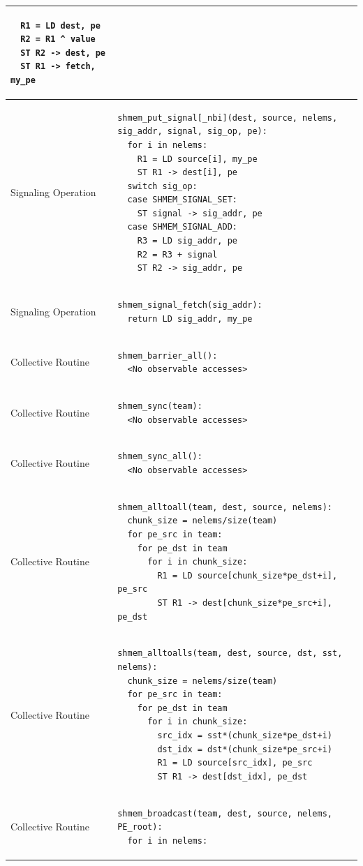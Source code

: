 \begin{longtable}{|m{}|m{}|}
\begin{BVerbatim}
  R1 = LD dest, pe
  R2 = R1 ^ value
  ST R2 -> dest, pe
  ST R1 -> fetch, my_pe
    \end{BVerbatim}
    \tabularnewline\hline
Signaling Operation
    & \begin{BVerbatim}
shmem_put_signal[_nbi](dest, source, nelems,
sig_addr, signal, sig_op, pe):
  for i in nelems:
    R1 = LD source[i], my_pe
    ST R1 -> dest[i], pe
  switch sig_op:
  case SHMEM_SIGNAL_SET:
    ST signal -> sig_addr, pe
  case SHMEM_SIGNAL_ADD:
    R3 = LD sig_addr, pe
    R2 = R3 + signal
    ST R2 -> sig_addr, pe
    \end{BVerbatim}
    \tabularnewline\hline
Signaling Operation
    & \begin{BVerbatim}
shmem_signal_fetch(sig_addr):
  return LD sig_addr, my_pe
    \end{BVerbatim}
    \tabularnewline\hline
Collective Routine
    & \begin{BVerbatim}
shmem_barrier_all():
  <No observable accesses>
    \end{BVerbatim}
    \tabularnewline\hline
Collective Routine
    & \begin{BVerbatim}
shmem_sync(team):
  <No observable accesses>
    \end{BVerbatim}
    \tabularnewline\hline
Collective Routine
    & \begin{BVerbatim}
shmem_sync_all():
  <No observable accesses>
    \end{BVerbatim}
    \tabularnewline\hline
Collective Routine
    & \begin{BVerbatim}
shmem_alltoall(team, dest, source, nelems):
  chunk_size = nelems/size(team)
  for pe_src in team:
    for pe_dst in team
      for i in chunk_size:
        R1 = LD source[chunk_size*pe_dst+i], pe_src
        ST R1 -> dest[chunk_size*pe_src+i], pe_dst
    \end{BVerbatim}
    \tabularnewline\hline
Collective Routine
    & \begin{BVerbatim}
shmem_alltoalls(team, dest, source, dst, sst,
nelems):
  chunk_size = nelems/size(team)
  for pe_src in team:
    for pe_dst in team
      for i in chunk_size:
        src_idx = sst*(chunk_size*pe_dst+i)
        dst_idx = dst*(chunk_size*pe_src+i)
        R1 = LD source[src_idx], pe_src
        ST R1 -> dest[dst_idx], pe_dst
    \end{BVerbatim}
    \tabularnewline\hline
Collective Routine
    & \begin{BVerbatim}
shmem_broadcast(team, dest, source, nelems, PE_root):
  for i in nelems:

\end{BVerbatim}
\end{longtable}

